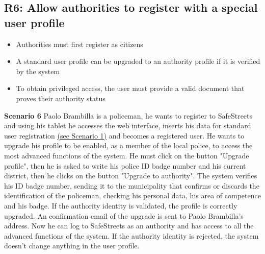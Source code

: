 \subsection{R6: Allow authorities to register with a special user profile}
\begin{itemize}
    \item Authorities must first register as citizens
    \item A standard user profile can be upgraded to an authority profile if it is verified by the system
    \item To obtain privileged access, the user must provide a valid document that proves their authority status
\end{itemize}
\begin{description}
    \item \textbf{Scenario 6} \newline
        Paolo Brambilla is a policeman, he wants to register to SafeStreets and using his tablet he accesses the web interface, inserts his data for standard user registration \hyperref[scenario1]{(see Scenario 1)} and becomes a registered user. He wants to upgrade his profile to be enabled, as a member of the local police, to access the most advanced functions of the system. He must click on the button "Upgrade profile", then he is asked to write his police ID badge number and his current district, then he clicks on the button "Upgrade to authority". The system verifies his ID badge number, sending it to the municipality that confirms or discards the identification of the policeman, checking his personal data, his area of competence and his badge. If the authority identity is validated, the profile is correctly upgraded. An confirmation email of the upgrade is sent to Paolo Brambilla's address. Now he can log to SafeStreets as an authority and has access to all the advanced functions of the system. If the authority identity is rejected, the system doesn't change anything in the user profile.


\end{description}
